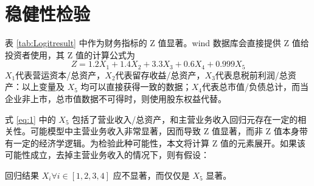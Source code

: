 \section{稳健性检验}
表 \ref{tab:Logitresult} 中作为财务指标的 Z 值显著。wind 数据库会直接提供 Z 值给投资者使用，其 Z 值的计算公式为
\begin{equation}
	\label{eq:1}
	Z=1.2X_1+1.4X_2+3.3X_3+0.6X_4+0.999X_5
\end{equation}
\(X_1\)代表营运资本/总资产，\(X_2\)代表留存收益/总资产，\(X_3\)代表息税前利润/总资产：以上变量及 \(X_5\) 均可以直接获得一致的数据；\(X_4\)代表总市值/负债总计，而当企业非上市，总市值数据不可得时，则使用股东权益代替。

式 \ref{eq:1} 中的 \(X_{5}\) 包括了营业收入/总资产，和主营业务收入回归元存在一定的相关性。可能模型中主营业务收入非常显著，因而导致 Z 值显著，而非 Z 值本身带有一定的经济学逻辑。为检验此种可能性，本文将计算 Z 值的元素展开。如果该可能性成立，去掉主营业务收入的情况下，则有假设：

\begin{hyp}
	\label{hyp:1}
	回归结果 \(X_i\forall i\in [1,2,3,4] \) 应不显著，而仅仅是 \(X_5\) 显著。
\end{hyp}

